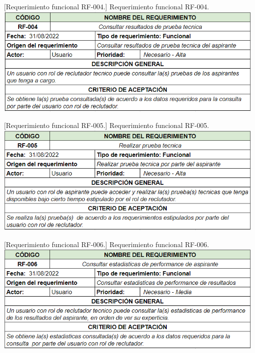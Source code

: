 \begin{enumerate}
        \vspace{2mm}
        \begin{minipage}{0.9\textwidth}
        \centering
        [{Requerimiento funcional RF-004.}]{ Requerimiento funcional RF-004. }
        \label{req4}
         \includegraphics[width=1\textwidth]{Images/4.png}
        \end{minipage}
        
        \vspace{2mm}
        \begin{minipage}{0.9\textwidth}
        \centering
        [{Requerimiento funcional RF-005.}]{ Requerimiento funcional RF-005. }
        \label{req5}
         \includegraphics[width=1\textwidth]{Images/5.png}
        \end{minipage}
        
        \vspace{2mm}
        \begin{minipage}{0.9\textwidth}
        \centering
        [{Requerimiento funcional RF-006.}]{ Requerimiento funcional RF-006. }
        \label{req6}
         \includegraphics[width=1\textwidth]{Images/6.png}
        \end{minipage}
        

\end{enumerate}
